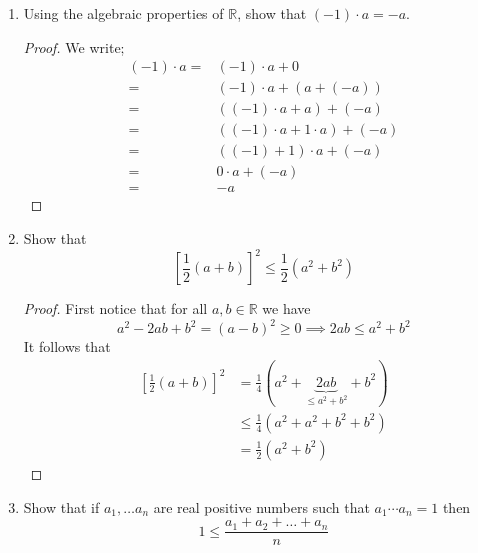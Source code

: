 \documentclass[12pt, reqno]{article}
\numberwithin{equation}{section}
\theoremstyle{definition}
\theoremstyle{remark}
\newcommand{\RR}{\mathbb{R}}
\begin{document}
\begin{enumerate}[leftmargin=*]
	\item Using the algebraic properties of $\RR$, show that $(-1)\cdot a = -a$.

	      \begin{proof}
		      We write;
		      \begin{align*}
			      (-1)\cdot a
			      = & (-1)\cdot a + 0\tag{A3 : existence of a zero element}     \\
			      = & (-1)\cdot a + (a + (-a))                                  \\
			      = & ((-1)\cdot a + a) + (-a)\tag{A2 : associativity}          \\
			      = & ((-1)\cdot a + 1\cdot a) + (-a) \tag{M3: existence 1}     \\
			      = & ((-1) + 1)\cdot a + (-a) \tag{D :  distributive property} \\
			      = & 0\cdot a + (-a)                                           \\
			      = & -a \tag{Theorem 2.1.2 (c)}
		      \end{align*}
	      \end{proof}

	\item Show that
	      \[
		      \left[\frac{1}{2}(a+b)\right]^2 \leq \frac{1}{2}\left(a^2+b^2\right)
	      \]
	      \begin{proof}
		      First notice that for all $a,b \in \RR$ we have
		      \[
			      a^2-2ab+b^2 = (a-b)^2  \geq 0
			      \implies 2ab \leq a^2+b^2
		      \]
		      It follows that
		      \begin{align*}
			      \left[\frac{1}{2}(a+b)\right]^2
			       & =\frac{1}{4}\left(a^2+\underbrace{2ab}_{\leq a^2+b^2}+b^2\right) \\
			       & \leq \frac{1}{4}\left(a^2 + a^2+b^2 + b^2\right)                 \\
			       & =\frac{1}{2}\left(a^2+b^2\right)
		      \end{align*}
	      \end{proof}

	\item Show that if $a_1, \dots a_n$ are real positive numbers such that $a_1\cdots a_n = 1$ then
	      \[
		      1 \leq \frac{a_1 + a_2 + \dots + a_n}{n}
	      \]


\end{enumerate}
\end{document}

